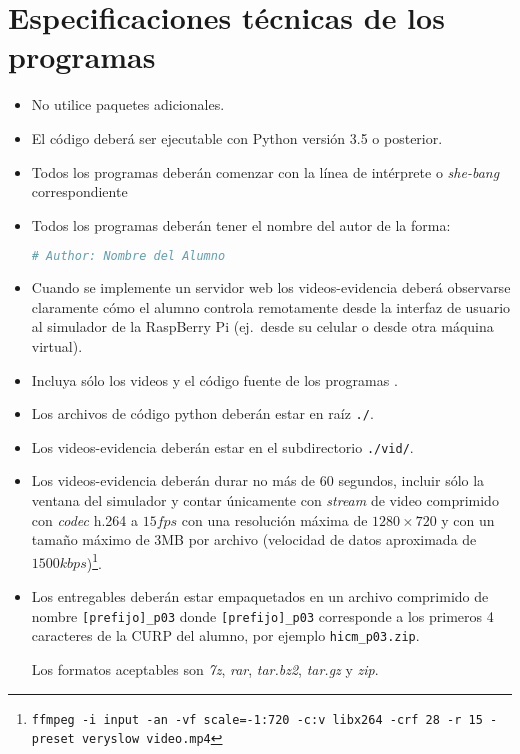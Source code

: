 \section{Especificaciones técnicas de los programas}%
\label{sec:programs-specs}
\begin{itemize}[noitemsep]
	\item No utilice paquetes adicionales.
	\item El código deberá ser ejecutable con Python versión 3.5 o posterior.
	\item Todos los programas deberán comenzar con la línea de intérprete o \emph{she-bang} correspondiente
	\item Todos los programas deberán tener el nombre del autor de la forma:

\begin{lstlisting}[language=python]
# Author: Nombre del Alumno
\end{lstlisting}

	\item Cuando se implemente un servidor web los videos-evidencia deberá observarse claramente cómo el alumno controla remotamente desde la interfaz de usuario al simulador de la RaspBerry Pi (ej.~desde su celular o desde otra máquina virtual).

	\item Incluya sólo los videos y el código fuente de los programas .

	\item Los archivos de código python deberán estar en raíz \texttt{./}.

	\item Los videos-evidencia deberán estar en el subdirectorio \texttt{./vid/}.

	\item Los videos-evidencia deberán durar no más de 60 segundos, incluir sólo la ventana del simulador y contar únicamente con \emph{stream} de video comprimido con \emph{codec} h.264 a \(15fps\) con una resolución máxima de \(1280 \times 720\) y con un tamaño máximo de 3MB por archivo (velocidad de datos aproximada de \(1500kbps\))\footnote{\texttt{ffmpeg -i input -an -vf scale=-1:720 -c:v libx264 -crf 28 -r 15 -preset veryslow video.mp4}}.

	\item Los entregables deberán estar empaquetados en un archivo comprimido de nombre \texttt{[prefijo]\_p03} donde \texttt{[prefijo]\_p03} corresponde a los primeros 4 caracteres de la CURP del alumno, por ejemplo \texttt{hicm\_p03.zip}.

	Los formatos aceptables son \emph{7z}, \emph{rar}, \emph{tar.bz2}, \emph{tar.gz} y \emph{zip}.
\end{itemize}